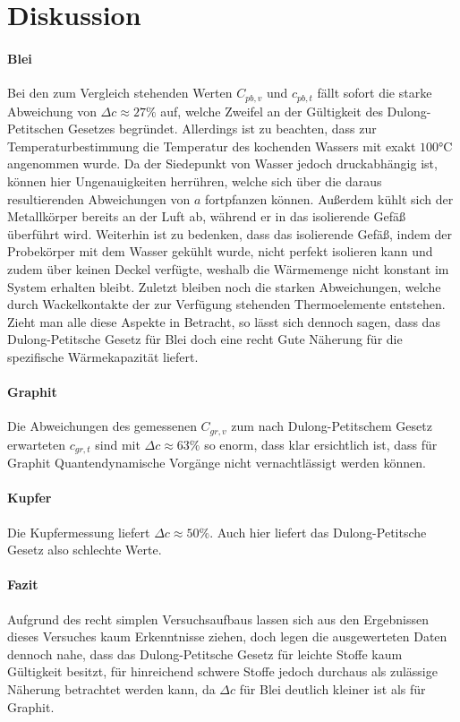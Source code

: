 \section{Diskussion}
\label{sec:Diskussion}


\paragraph{Blei}

Bei den zum Vergleich stehenden Werten $C_{pb,v}$ und $c_{pb,t}$ fällt sofort die starke Abweichung von $\Delta c \approx 27 \%$ auf, welche Zweifel an der Gültigkeit des Dulong-Petitschen Gesetzes begründet. Allerdings ist zu beachten, dass zur Temperaturbestimmung die Temperatur des kochenden Wassers mit exakt $100 \si{\celsius}$ angenommen wurde. Da der Siedepunkt von Wasser jedoch druckabhängig ist, können hier Ungenauigkeiten herrühren, welche sich über die daraus resultierenden Abweichungen von $a$ fortpfanzen können. Außerdem kühlt sich der Metallkörper bereits an der Luft ab, während er in das isolierende Gefäß überführt wird. Weiterhin ist zu bedenken, dass das isolierende Gefäß, indem der Probekörper mit dem Wasser gekühlt wurde, nicht perfekt isolieren kann und zudem über keinen Deckel verfügte, weshalb die Wärmemenge nicht konstant im System erhalten bleibt. Zuletzt bleiben noch die starken Abweichungen, welche durch Wackelkontakte der zur Verfügung stehenden Thermoelemente entstehen.
Zieht man alle diese Aspekte in Betracht, so lässt sich dennoch sagen, dass das Dulong-Petitsche Gesetz für Blei doch eine recht Gute Näherung für die spezifische Wärmekapazität liefert.

\paragraph{Graphit}
Die Abweichungen des gemessenen $C_{gr,v}$ zum nach Dulong-Petitschem Gesetz erwarteten $c_{gr,t}$ sind mit $\Delta c \approx 63 \%$ so enorm, dass klar ersichtlich ist, dass für Graphit Quantendynamische Vorgänge nicht vernachtlässigt werden können.

\paragraph{Kupfer}
Die Kupfermessung liefert $\Delta c \approx 50 \%$. Auch hier liefert das Dulong-Petitsche Gesetz also schlechte Werte.

\paragraph{Fazit}
Aufgrund des recht simplen Versuchsaufbaus lassen sich aus den Ergebnissen dieses Versuches kaum Erkenntnisse ziehen, doch legen die ausgewerteten Daten dennoch nahe, dass das Dulong-Petitsche Gesetz für leichte Stoffe kaum Gültigkeit besitzt, für hinreichend schwere Stoffe jedoch durchaus als zulässige Näherung betrachtet werden kann, da $\Delta c$ für Blei deutlich kleiner ist als für Graphit.
